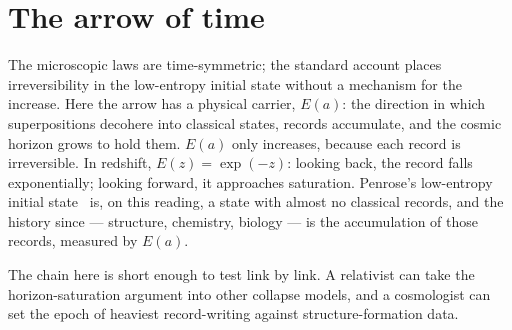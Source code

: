 \section{The arrow of time}
The microscopic laws are time-symmetric; the standard account places irreversibility in the low-entropy initial state without a mechanism for the
increase. Here the arrow has a physical carrier, $E(a)$: the direction in which superpositions decohere into classical states, records accumulate, and
the cosmic horizon grows to hold them. $E(a)$ only increases, because each record is irreversible. In redshift, $E(z)=\exp(-z)$: looking back, the record
falls exponentially; looking forward, it approaches saturation. Penrose's low-entropy initial state~\cite{Penrose1989} is, on this reading, a state with almost no classical
records, and the history since --- structure, chemistry, biology --- is the accumulation of those records, measured by $E(a)$. \interp

The chain here is short enough to test link by link. A relativist can take the horizon-saturation argument into other collapse models, and a cosmologist can set the epoch of heaviest record-writing against structure-formation data.
